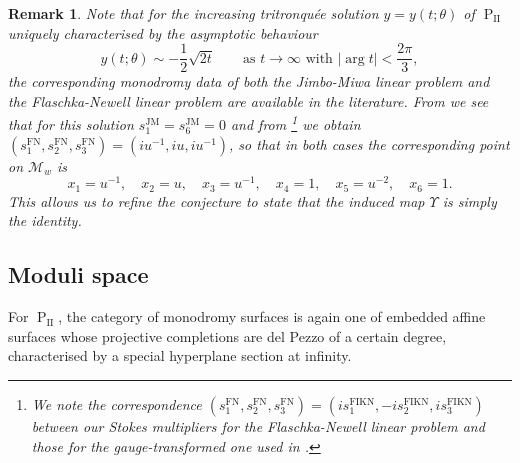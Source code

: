\documentclass[a4paper,reqno]{amsart}
\numberwithin{equation}{section}
\newcommand{\pain}[1]{\operatorname{P}_{\mathrm{#1}}}
\newtheorem{remark}[theorem]{Remark}
\numberwithin{equation}{section}
\begin{document}
\begin{remark}
Note that for the increasing tritronqu\'ee solution $y=y(t;\theta)$ of $\pain{II}$ uniquely characterised by the asymptotic behaviour
\begin{equation*}
    y(t;\theta)\sim -\frac{1}{2}\sqrt{2t} \qquad \text{as }t\rightarrow \infty\text{ with }|\arg t|<\frac{2\pi}{3},
\end{equation*}
the corresponding monodromy data of both the Jimbo-Miwa linear problem  and the Flaschka-Newell linear problem  are available in the literature. 
From \cite{millerincreasing18} we see that for this solution $s_1^{\operatorname{JM}}=s_6^{\operatorname{JM}}=0$ and from \cite[Sec. 11.5]{fokas}\footnote{We note the correspondence $(s_1^{\operatorname{FN}},s_2^{\operatorname{FN}},s_3^{\operatorname{FN}})=(is_1^{\operatorname{FIKN}},-is_2^{\operatorname{FIKN}},is_3^{\operatorname{FIKN}})$ between our Stokes multipliers for the Flaschka-Newell linear problem and those for the gauge-transformed one used in \cite[Sec. 11]{fokas}.} we obtain $(s_1^{\operatorname{FN}},s_2^{\operatorname{FN}},s_3^{\operatorname{FN}})=(i u^{-1},iu,iu^{-1})$, so that in both cases the corresponding point on $\mathcal{M}_w$ is
\begin{equation*}
    x_1=u^{-1},\quad x_2=u,\quad x_3=u^{-1},\quad x_4=1,\quad
    x_5=u^{-2},\quad
    x_6=1.
\end{equation*}
This allows us to refine the conjecture to state that the induced map $\Upsilon$ is simply the identity.
\end{remark}







\subsection{Moduli space}

For $\pain{II}$, the category of monodromy surfaces is again one of embedded affine surfaces whose projective completions are del Pezzo of a certain degree, characterised by a special hyperplane section at infinity.
\end{document}
